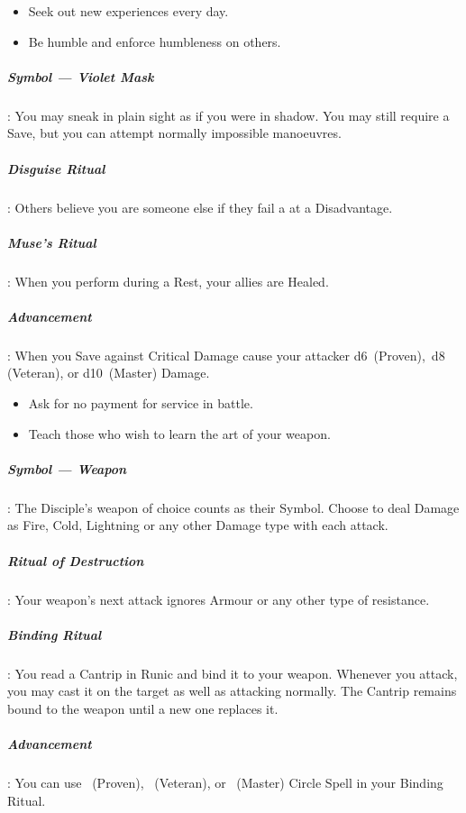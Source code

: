 \documentclass[itdr]{subfiles}
\begin{document}
\vfill
\break

{\em\begin{itemize}
		\item Seek out new experiences every day.
		\item Be humble and enforce humbleness on others.
\end{itemize}}

\subparagraph{Symbol --- Violet Mask}: You may sneak in plain sight as if you were in shadow. You may still require a Save, but you can attempt normally impossible manoeuvres.

\subparagraph{Disguise Ritual}: Others believe you are someone else if they fail a  at a Disadvantage.

\subparagraph{Muse's Ritual}: When you perform during a Rest, your allies are Healed.

\subparagraph{Advancement}: When you Save against Critical Damage cause your attacker d6~(Proven),~d8 (Veteran), or d10~(Master) Damage.

\vspace{2ex}

{\em\begin{itemize}
		\item Ask for no payment for service in battle.
		\item Teach those who wish to learn the art of your weapon.
\end{itemize}}

\subparagraph{Symbol --- Weapon}: The Disciple's weapon of choice counts as their Symbol. Choose to deal Damage as Fire, Cold, Lightning or any other Damage type with each attack.

\subparagraph{Ritual of Destruction}: Your weapon's next attack ignores Armour or any other type of resistance.

\subparagraph{Binding Ritual}: You read a Cantrip in Runic and bind it to your weapon. Whenever you attack, you may cast it on the target as well as attacking normally. The Cantrip remains bound to the weapon until a new one replaces it.

\subparagraph{Advancement}: You can use ~(Proven), ~(Veteran), or ~(Master) Circle Spell in your Binding Ritual.

\vfill

\begin{comment}

\creed{???}
{\em\begin{itemize}
\item ???
\item ???
\end{itemize}}

\subparagraph{Symbol --- ???}:

\subparagraph{??? Ritual}:

\subparagraph{??? Ritual}:

\subparagraph{Advancement}:

\end{comment}
\end{document}
